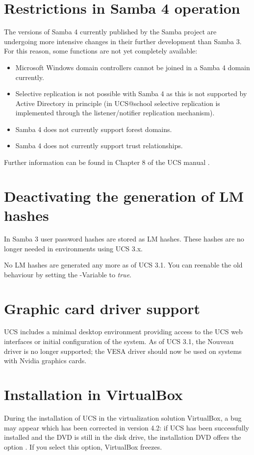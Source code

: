 \section{Restrictions in Samba 4 operation}

The versions of Samba 4 currently published by the Samba project are
undergoing more intensive changes in their further
development than Samba 3. For this reason, some functions are not yet
completely available:

\begin{itemize}
\item Microsoft Windows domain controllers cannot be joined in a Samba
4 domain currently.
\item Selective replication is not possible with Samba 4 as this is
not supported by Active Directory in principle (in UCS@school
selective replication is implemented through the listener/notifier
replication mechanism).

\item Samba 4 does not currently support forest domains. 
\item Samba 4 does not currently support trust relationships.
\end{itemize}

Further information can be found in Chapter 8 of the UCS
manual \cite{UCS-Handbuch}.

\section{Deactivating the generation of LM hashes}
In Samba 3 user password hashes are stored as LM hashes. These hashes
are no longer needed in environments using UCS 3.x. 

No LM hashes are generated any more as of UCS 3.1. You can reenable
the old behaviour by setting the \ucsUCR{}-Variable 
to \emph{true}.

\section{Graphic card driver support}
UCS includes a minimal desktop environment providing access to the UCS
web interfaces or initial configuration of the system. As of UCS 3.1,
the Nouveau driver is no longer supported; the VESA driver should now
be used on systems with Nvidia graphics cards.

\section{Installation in VirtualBox}
During the installation of UCS in the virtualization solution VirtualBox, a bug
may appear which has been corrected in version 4.2: if UCS has been
successfully installed and the DVD is still in the disk drive, the
installation DVD offers the option . If you select this option, VirtualBox freezes. 

